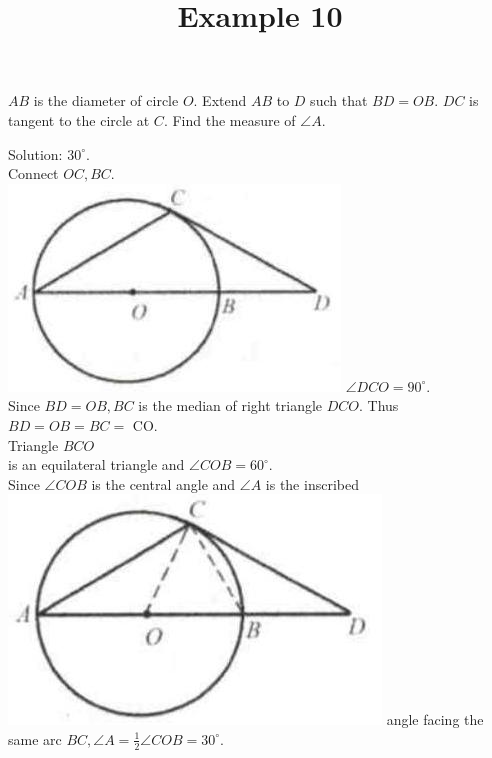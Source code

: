 \documentclass{article}
\title{Example 10}
\date{}
\begin{document}
\maketitle

\(A B\) is the diameter of circle \(O\). Extend \(A B\) to \(D\) such that \(B D=O B\). \(D C\) is tangent to the circle at \(C\). Find the measure of \(\angle A\).

Solution: \(30^{\circ}\).\\
Connect \(O C, B C\).\\
\includegraphics[width=\textwidth]{images/problem_image_1.jpg} \(\angle D C O=90^{\circ}\).\\
Since \(B D=O B, B C\) is the median of right triangle \(D C O\). Thus \(B D=O B=B C=\) CO.\\
Triangle \(B C O\)\\
is an equilateral triangle and \(\angle C O B=60^{\circ}\).\\
Since \(\angle C O B\) is the central angle and \(\angle A\) is the inscribed\\
\includegraphics[width=\textwidth]{images/reasoning_image_1.jpg} angle facing the same arc \(B C, \angle A=\frac{1}{2} \angle C O B=30^{\circ}\).
\end{document}
